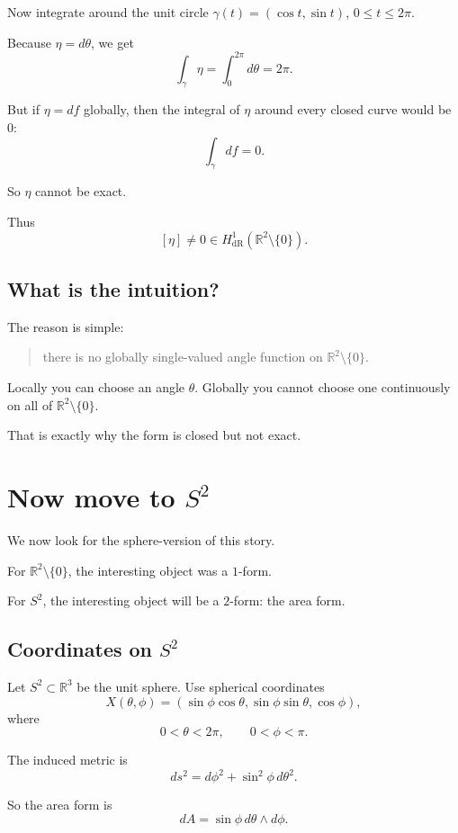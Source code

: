 \documentclass[11pt]{article}
\begin{document}
	Now integrate around the unit circle \(\gamma(t)=(\cos t,\sin t)\), \(0\le t\le 2\pi\).
	
	Because \(\eta=d\theta\), we get
	\[
	\int_\gamma \eta=\int_0^{2\pi} d\theta=2\pi.
	\]
	
	But if \(\eta=df\) globally, then the integral of \(\eta\) around every closed curve would be \(0\):
	\[
	\int_\gamma df=0.
	\]
	
	So \(\eta\) cannot be exact.
	
	Thus
	\[
	[\eta]\neq 0\in H^1_{\mathrm{dR}}(\mathbb{R}^2\setminus\{0\}).
	\]
	
	\subsection{What is the intuition?}
	
	The reason is simple:
	
	\begin{quote}
		there is no globally single-valued angle function on \(\mathbb{R}^2\setminus\{0\}\).
	\end{quote}
	
	Locally you can choose an angle \(\theta\). Globally you cannot choose one continuously on all of \(\mathbb{R}^2\setminus\{0\}\).
	
	That is exactly why the form is closed but not exact.
	
	\section{Now move to \(S^2\)}
	
	We now look for the sphere-version of this story.
	
	For \(\mathbb{R}^2\setminus\{0\}\), the interesting object was a \(1\)-form.
	
	For \(S^2\), the interesting object will be a \(2\)-form: the area form.
	
	\subsection{Coordinates on \(S^2\)}
	
	Let \(S^2\subset \mathbb{R}^3\) be the unit sphere. Use spherical coordinates
	\[
	X(\theta,\phi)=
	(\sin\phi\cos\theta,\sin\phi\sin\theta,\cos\phi),
	\]
	where
	\[
	0<\theta<2\pi,\qquad 0<\phi<\pi.
	\]
	
	The induced metric is
	\[
	ds^2=d\phi^2+\sin^2\phi\,d\theta^2.
	\]
	
	So the area form is
	\[
	dA=\sin\phi\,d\theta\wedge d\phi.
	\]
	
\end{document}
